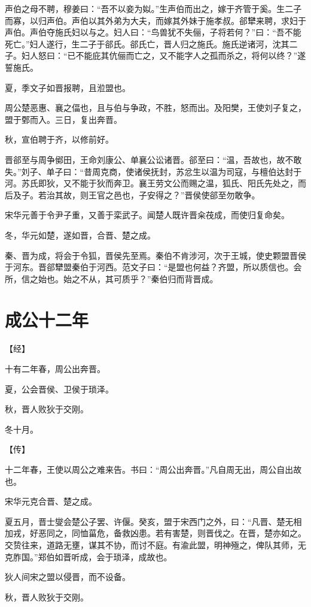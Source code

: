 \documentclass[a4paper,12pt,UTF8,twoside]{ctexbook}
\begin{document}
声伯之母不聘，穆姜曰：“吾不以妾为姒。”生声伯而出之，嫁于齐管于奚。生二子而寡，以归声伯。声伯以其外弟为大夫，而嫁其外妹于施孝叔。郤犫来聘，求妇于声伯。声伯夺施氏妇以与之。妇人曰：“鸟兽犹不失俪，子将若何？”曰：“吾不能死亡。”妇人遂行，生二子于郤氏。郤氏亡，晋人归之施氏。施氏逆诸河，沈其二子。妇人怒曰：“已不能庇其伉俪而亡之，又不能字人之孤而杀之，将何以终？”遂誓施氏。

夏，季文子如晋报聘，且涖盟也。

周公楚恶惠、襄之偪也，且与伯与争政，不胜，怒而出。及阳樊，王使刘子复之，盟于鄄而入。三日，复出奔晋。

秋，宣伯聘于齐，以修前好。

晋郤至与周争鄇田，王命刘康公、单襄公讼诸晋。郤至曰：“温，吾故也，故不敢失。”刘子、单子曰：“昔周克商，使诸侯抚封，苏忿生以温为司寇，与檀伯达封于河。苏氏即狄，又不能于狄而奔卫。襄王劳文公而赐之温，狐氏、阳氏先处之，而后及子。若治其故，则王官之邑也，子安得之？”晋侯使郤至勿敢争。

宋华元善于令尹子重，又善于栾武子。闻楚人既许晋籴茷成，而使归复命矣。

冬，华元如楚，遂如晋，合晋、楚之成。

秦、晋为成，将会于令狐，晋侯先至焉。秦伯不肯涉河，次于王城，使史颗盟晋侯于河东。晋郤犫盟秦伯于河西。范文子曰：“是盟也何益？齐盟，所以质信也。会所，信之始也。始之不从，其可质乎？”秦伯归而背晋成。


\chapter{成公十二年}



【经】

十有二年春，周公出奔晋。

夏，公会晋侯、卫侯于琐泽。

秋，晋人败狄于交刚。

冬十月。

【传】

十二年春，王使以周公之难来告。书曰：“周公出奔晋。”凡自周无出，周公自出故也。

宋华元克合晋、楚之成。

夏五月，晋士燮会楚公子罢、许偃。癸亥，盟于宋西门之外，曰：“凡晋、楚无相加戎，好恶同之，同恤菑危，备救凶患。若有害楚，则晋伐之。在晋，楚亦如之。交贽往来，道路无壅，谋其不协，而讨不庭。有渝此盟，明神殛之，俾队其师，无克胙国。”郑伯如晋听成，会于琐泽，成故也。

狄人间宋之盟以侵晋，而不设备。

秋，晋人败狄于交刚。
\end{document}
